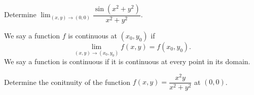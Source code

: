 \documentclass[11pt]{article}
\theoremstyle{break}
\numberwithin{equation}{theorem}
\begin{document}
\begin{example}
    Determine $\displaystyle\lim_{(x, y)\to(0, 0)}\dfrac{\sin(x^2+y^2)}{x^2+y^2}$.
\end{example}

\begin{definition}[Continuity]
    We say a function $f$ is continuous at $(x_0, y_0)$ if $$\lim_{(x, y)\to(x_0, y_0)}f(x, y)=f(x_0, y_0).$$ We say a function is continuous if it is continuous at every point in its domain.
\end{definition}

\begin{example}
    Determine the conitnuity of the function $f(x, y)=\dfrac{x^2y}{x^2+y^2}$ at $(0, 0)$.
\end{example}
\end{document}
